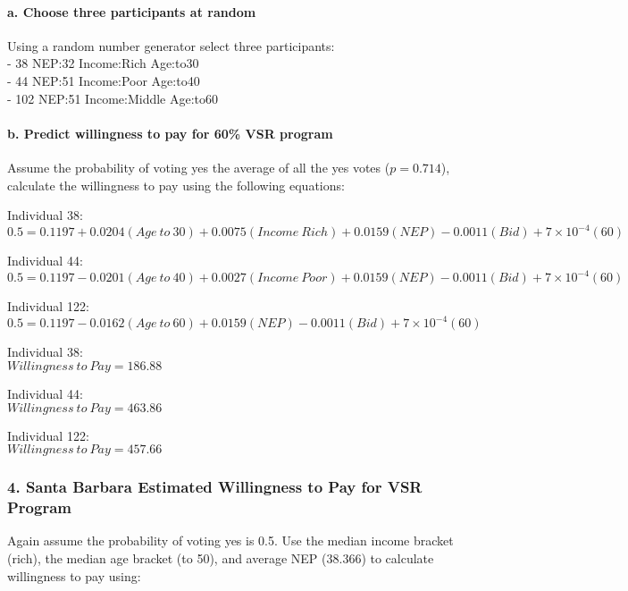 \documentclass[10pt,]{article}
\let\oldparagraph\paragraph
\renewcommand{\paragraph}[1]{\oldparagraph{#1}\mbox{}}
\begin{document}
\paragraph{a. Choose three participants at
random}\label{a.-choose-three-participants-at-random}

Using a random number generator select three participants:\\
- 38 NEP:32 Income:Rich Age:to30\\
- 44 NEP:51 Income:Poor Age:to40\\
- 102 NEP:51 Income:Middle Age:to60

\paragraph{b. Predict willingness to pay for 60\% VSR
program}\label{b.-predict-willingness-to-pay-for-60-vsr-program}

Assume the probability of voting yes the average of all the yes votes
(\(p = 0.714\)), calculate the willingness to pay using the following
equations:

Individual 38:\\
\(0.5 = 0.1197 + 0.0204(Age~to~30) + 0.0075(Income~Rich) + 0.0159(NEP) - 0.0011(Bid) + 7\times 10^{-4}(60)\)

Individual 44:\\
\(0.5 = 0.1197 - 0.0201(Age~to~40) + 0.0027(Income~Poor) + 0.0159(NEP) - 0.0011(Bid) + 7\times 10^{-4}(60)\)

Individual 122:\\
\(0.5 = 0.1197- 0.0162(Age~to~60) + 0.0159(NEP) - 0.0011(Bid)+ 7\times 10^{-4}(60)\)

Individual 38:\\
\(Willingness~to~Pay = 186.88\)

Individual 44:\\
\(Willingness~to~Pay = 463.86\)

Individual 122:\\
\(Willingness~to~Pay = 457.66\)

\subsubsection{4. Santa Barbara Estimated Willingness to Pay for VSR
Program}\label{santa-barbara-estimated-willingness-to-pay-for-vsr-program}

Again assume the probability of voting yes is 0.5. Use the median income
bracket (rich), the median age bracket (to 50), and average NEP (38.366)
to calculate willingness to pay using:
\end{document}
